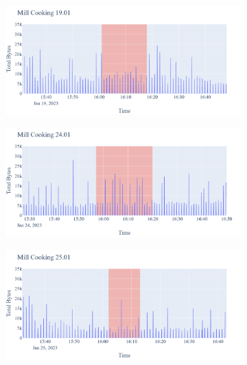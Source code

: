 \begin{figure}[H]
\begin{subfigure}[b]{0.47\textwidth}
    \end{subfigure}
    \begin{subfigure}[b]{0.47\textwidth}
        \centering
        \includegraphics[width=1.2\hsize]{figures/Mill_Cooking_Bytes_19.01.png}
    \end{subfigure}
    \begin{subfigure}[b]{0.47\textwidth}
        \centering
        \includegraphics[width=1.2\hsize]{figures/Mill_Cooking_Bytes_24.01.png}
    \end{subfigure}
    \begin{subfigure}[b]{0.47\textwidth}
        \centering
        \includegraphics[width=1.2\hsize]{figures/Mill_Cooking_Bytes_25.01.png}
    \end{subfigure}
    \begin{subfigure}[b]{0.47\textwidth}

\end{subfigure}
\end{figure}
